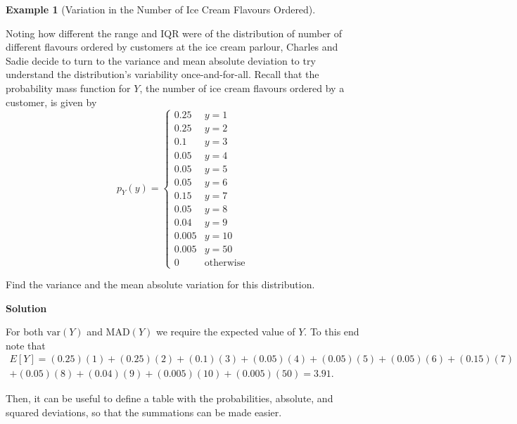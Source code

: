 \documentclass[
  letterpaper,
  DIV=11,
  numbers=noendperiod]{scrreprt}
\theoremstyle{definition}
\theoremstyle{definition}
\newtheorem{example}{Example}[chapter]
\theoremstyle{definition}
\theoremstyle{remark}
\begin{document}
\begin{example}[Variation in the Number of Ice Cream Flavours
Ordered]\protect\hypertarget{exm-variance}{}\label{exm-variance}

Noting how different the range and IQR were of the distribution of
number of different flavours ordered by customers at the ice cream
parlour, Charles and Sadie decide to turn to the variance and mean
absolute deviation to try understand the distribution's variability
once-and-for-all. Recall that the probability mass function for \(Y\),
the number of ice cream flavours ordered by a customer, is given by \[
p_Y(y) = \begin{cases} 
0.25 & y = 1 \\
0.25 & y = 2 \\
0.1 & y = 3 \\
0.05 & y = 4 \\
0.05 & y = 5 \\
0.05 & y = 6 \\
0.15 & y = 7 \\
0.05 & y = 8 \\
0.04 & y = 9 \\
0.005 & y = 10 \\ 
0.005 & y = 50 \\
0 & \text{otherwise}
\end{cases}
\]

Find the variance and the mean absolute variation for this distribution.

\begin{tcolorbox}[enhanced jigsaw, colback=white, colframe=quarto-callout-color-frame, arc=.35mm, leftrule=.75mm, rightrule=.15mm, opacityback=0, breakable, bottomrule=.15mm, left=2mm, toprule=.15mm]

\vspace{-3mm}\textbf{Solution}\vspace{3mm}

For both \(\text{var}(Y)\) and \(\text{MAD}(Y)\) we require the expected
value of \(Y\). To this end note that
\begin{multline*}E[Y] = (0.25)(1) + (0.25)(2) + (0.1)(3) + (0.05)(4) + (0.05)(5) + (0.05)(6) + (0.15)(7) \\ + (0.05)(8) + (0.04)(9) + (0.005)(10) + (0.005)(50) = 3.91.\end{multline*}

Then, it can be useful to define a table with the probabilities,
absolute, and squared deviations, so that the summations can be made
easier.


\end{tcolorbox}
\end{example}
\end{document}
